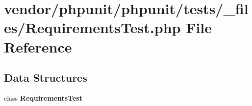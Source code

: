 \section{vendor/phpunit/phpunit/tests/\+\_\+files/\+Requirements\+Test.php File Reference}
\label{_requirements_test_8php}
\subsection*{Data Structures}
\begin{DoxyCompactItemize}
\item 
class {\bf Requirements\+Test}
\end{DoxyCompactItemize}
